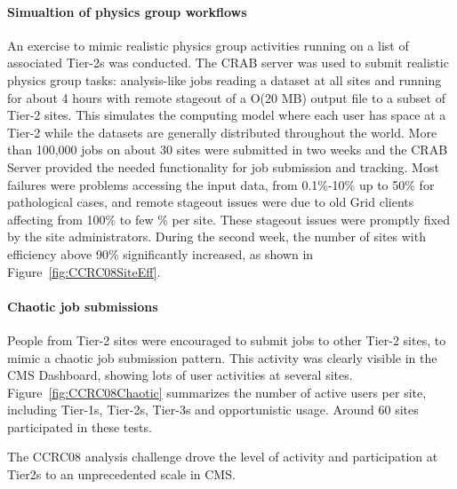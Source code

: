 \paragraph{Simualtion of physics group workflows}
An exercise to mimic realistic physics group activities running
on a list of associated Tier-2s was conducted. 
The CRAB server was used to submit realistic physics group tasks: 
analysis-like jobs reading a dataset at all sites and running for 
about 4 hours with remote stageout of a O(20 MB) output file to a subset of 
Tier-2 sites. This simulates the computing model where each user has space at 
a Tier-2 while the datasets are generally distributed throughout the world.
More than 100,000 jobs on about 30 sites were submitted in two weeks and 
the CRAB Server provided the needed functionality for job submission and 
tracking. %
Most failures were problems accessing the input data, from 0.1\%-10\% up to 50\% for pathological cases, and remote stageout issues were due to old Grid clients affecting from 100\% to few \% per site. These stageout issues were
promptly fixed by the site administrators. 
During the second week, the number of sites with efficiency above 90\% significantly increased, as shown in Figure~\ref{fig:CCRC08SiteEff}.
\paragraph{Chaotic job submissions}
People from Tier-2 sites were encouraged to submit jobs to other Tier-2 sites, to mimic a chaotic job submission pattern. This activity was clearly visible in the CMS Dashboard, showing lots of user activities at several sites. Figure~\ref{fig:CCRC08Chaotic} summarizes the number of active users per site, including Tier-1s, Tier-2s, Tier-3s and opportunistic usage. Around 60 sites participated in these tests.

The CCRC08 analysis challenge drove the level of activity and participation at Tier2s to an unprecedented scale in CMS.

